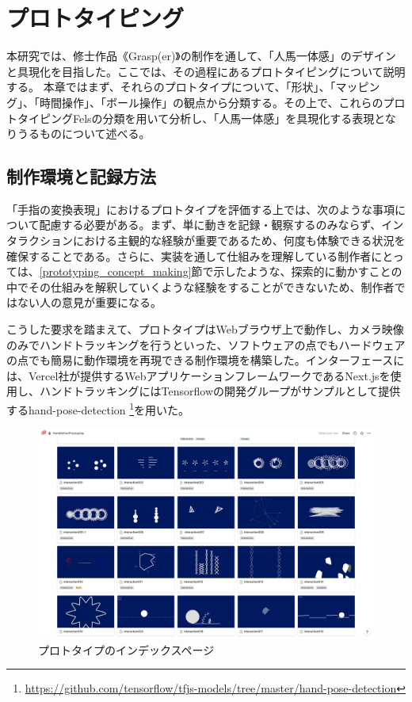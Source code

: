 \chapter{プロトタイピング}
\label{prototyping}
本研究では、修士作品《Grasp(er)》の制作を通して、「人馬一体感」のデザインと具現化を目指した。ここでは、その過程にあるプロトタイピングについて説明する。
本章ではまず、それらのプロトタイプについて、「形状」、「マッピング」、「時間操作」、「ボール操作」の観点から分類する。その上で、これらのプロトタイピングFelsの分類を用いて分析し、「人馬一体感」を具現化する表現となりうるものについて述べる。

\section{制作環境と記録方法}
「手指の変換表現」におけるプロトタイプを評価する上では、次のような事項について配慮する必要がある。まず、単に動きを記録・観察するのみならず、インタラクションにおける主観的な経験が重要であるため、何度も体験できる状況を確保することである。さらに、実装を通して仕組みを理解している制作者にとっては、\ref{prototyping_concept_making}節で示したような、探索的に動かすことの中でその仕組みを解釈していくような経験をすることができないため、制作者ではない人の意見が重要になる。

こうした要求を踏まえて、プロトタイプはWebブラウザ上で動作し、カメラ映像のみでハンドトラッキングを行うといった、ソフトウェアの点でもハードウェアの点でも簡易に動作環境を再現できる制作環境を構築した。インターフェースには、Vercel社が提供するWebアプリケーションフレームワークであるNext.jsを使用し、ハンドトラッキングにはTensorflowの開発グループがサンプルとして提供するhand-pose-detection \footnote{\url{https://github.com/tensorflow/tfjs-models/tree/master/hand-pose-detection}}を用いた。

\begin{figure}[H]
  \centering
  \includegraphics[width=15cm]{img/prototype_overview.png}
  \caption{プロトタイプのインデックスページ}
  \label{fig:prototype_overview}
\end{figure}

